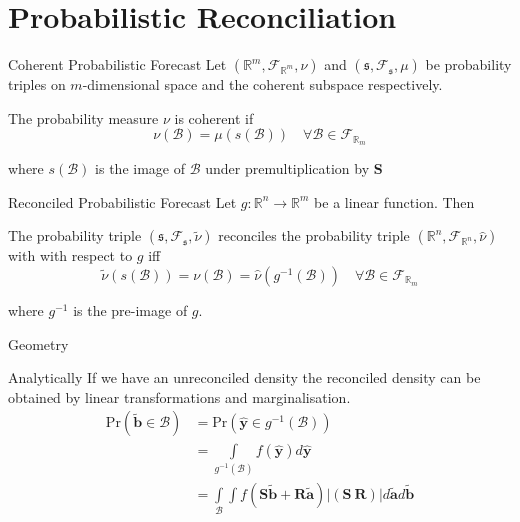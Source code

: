 \documentclass{beamer}
\begin{document}
  \section{Probabilistic Reconciliation}
  \begin{frame}{Coherent Probabilistic Forecast}
    Let $(\mathbb{R}^m,\mathcal{F}_{\mathbb{R}^m},\nu)$ and $(\mathfrak{s},\mathcal{F}_{\mathfrak{s}},\mu)$ be probability triples on $m$-dimensional space and the coherent subspace respectively.
    \begin{definition}
      The probability measure $\nu$ is coherent if
      \begin{equation*}
      \nu(\mathcal{B})=\mu(s(\mathcal{B}))\quad\forall\mathcal{B}\in \mathcal{F}_{\mathbb{R}_m}
      \end{equation*} 
    \end{definition}
    where $s(\mathcal{B})$ is the image of $\mathcal{B}$ under premultiplication by ${\bm S}$
  \end{frame}
  \begin{frame}{Reconciled Probabilistic Forecast}
  	Let $g:\mathbb{R}^n\rightarrow\mathbb{R}^m$ be a linear function.  Then 
  	\begin{definition}
  	The probability triple $\left(\mathfrak{s},\mathcal{F}_{\mathfrak{s}},\tilde{\nu}\right)$ reconciles the probability triple $\left(\mathbb{R}^n,\mathcal{F}_{\mathbb{R}^n},\hat{\nu}\right)$ with with respect to $g$ iff
  	\begin{equation*}
  	\tilde{\nu}(s(\mathcal{B}))=\nu(\mathcal{B})=\hat{\nu}(g^{-1}(\mathcal{B}))\quad\forall \mathcal{B}\in\mathcal{F}_{\mathbb{R}_m}
  	\end{equation*}
  	\end{definition}
    where $g^{-1}$ is the pre-image of $g$.
  \end{frame}
  \begin{frame}{Geometry}
  	\centering
  	
  \end{frame}
  \begin{frame}{Analytically}
  	If we have an unreconciled density the reconciled density can be obtained by linear transformations and marginalisation.
  	\begin{align*}
  	\mbox{Pr}(\tilde{\bm{b}}\in \mathcal{B})&=\mbox{Pr}(\hat{\bm{y}}\in g^{-1}(\mathcal{B}))\\
  	&=\int\limits_{g^{-1}(\mathcal{B})}f(\hat{\bm{y}})d\hat{\bm{y}}\\
  	&=\int\limits_{\mathcal{B}}\int f(\bm{S}\tilde{\bm{b}}+\bm{R}\tilde{\bm{a}})|\left(\bm{S}~\bm{R}\right)|d\tilde{\bm{a}}d\tilde{\bm{b}}
  	\end{align*}
  \end{frame}
\end{document}
